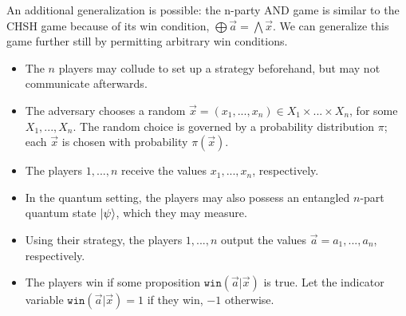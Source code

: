 





An additional generalization is possible: the n-party AND game is similar to the CHSH game because of its win condition, $\bigoplus \vec{a} = \bigwedge \vec{x}$. We can generalize this game further still by permitting arbitrary win conditions.

\begin{itemize}
\item{The $n$ players may collude to set up a strategy beforehand, but may not communicate afterwards.}
\item{The adversary chooses a random $\vec{x}=(x_1, ..., x_n) \in X_1 \times ... \times X_n$, for some $X_1, ..., X_n$. The random choice is governed by a probability distribution $\pi$; each $\vec{x}$ is chosen with probability $\pi(\vec{x})$.}
\item{The players $1, ..., n$ receive the values $x_1, ..., x_n$, respectively.}
\item{In the quantum setting, the players may also possess an entangled $n$-part quantum state $\ket{\psi}$, which they may measure.}
\item{Using their strategy, the players $1, ..., n$ output the values $\vec{a} = a_1, ..., a_n$, respectively.}
\item{The players win if some proposition $\texttt{win}(\vec{a} | \vec{x})$ is true. Let the indicator variable $\texttt{win}(\vec{a}|\vec{x}) = 1$ if they win, $-1$ otherwise.}
\end{itemize}

